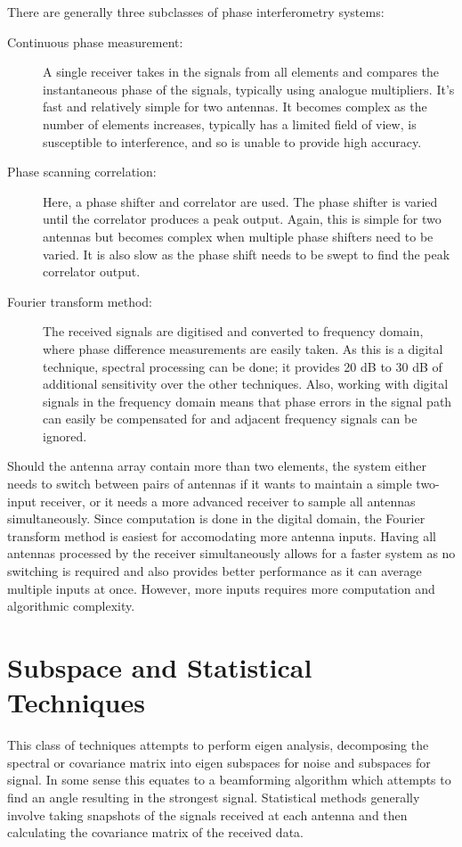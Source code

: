 There are generally three subclasses of phase interferometry systems\cite{jenkins1991smallaperture}:
\begin{description}
  \item [Continuous phase measurement:] A single receiver takes in the signals from all elements and compares the instantaneous phase of the signals, typically using analogue multipliers. It's fast and relatively simple for two antennas. It becomes complex as the number of elements increases, typically has a limited field of view, is susceptible to interference, and so is unable to provide high accuracy.
  \item [Phase scanning correlation:] Here, a phase shifter and correlator are used. The phase shifter is varied until the correlator produces a peak output. Again, this is simple for two antennas but becomes complex when multiple phase shifters need to be varied. It is also slow as the phase shift needs to be swept to find the peak correlator output.
  \item [Fourier transform method:] The received signals are digitised and converted to frequency domain, where phase difference measurements are easily taken. As this is a digital technique, spectral processing can be done; it provides 20 dB to 30 dB of additional sensitivity over the other techniques. Also, working with digital signals in the frequency domain means that phase errors in the signal path can easily be compensated for and adjacent frequency signals can be ignored.
\end{description}
Should the antenna array contain more than two elements, the system either needs to switch between pairs of antennas if it wants to maintain a simple two-input receiver, or it needs a more advanced receiver to sample all antennas simultaneously. Since computation is done in the digital domain, the Fourier transform method is easiest for accomodating more antenna inputs. Having all antennas processed by the receiver simultaneously allows for a faster system as no switching is required and also provides better performance as it can average multiple inputs at once. However, more inputs requires more computation and algorithmic complexity.

\section{Subspace and Statistical Techniques}
This class of techniques attempts to perform eigen analysis, decomposing the spectral or covariance matrix into eigen subspaces for noise and subspaces for signal. In some sense this equates to a beamforming algorithm which attempts to find an angle resulting in the strongest signal. 
Statistical methods generally involve taking snapshots of the signals received at each antenna and then calculating the covariance matrix of the received data\cite{poisel2012electronic}.

